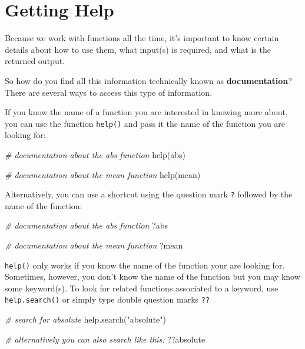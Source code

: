 \documentclass[
]{book}
\newenvironment{Shaded}{\begin{snugshade}}{\end{snugshade}}
\newcommand{\CommentTok}[1]{\textcolor[rgb]{0.56,0.35,0.01}{\textit{#1}}}
\newcommand{\FunctionTok}[1]{\textcolor[rgb]{0.00,0.00,0.00}{#1}}
\newcommand{\NormalTok}[1]{#1}
\newcommand{\StringTok}[1]{\textcolor[rgb]{0.31,0.60,0.02}{#1}}
\begin{document}
\hypertarget{help-documentation}{%
\section{Getting Help}\label{help-documentation}}

Because we work with functions all the time, it's important to know certain
details about how to use them, what input(s) is required, and what is the
returned output.

So how do you find all this information technically known as \textbf{documentation}?
There are several ways to access this type of information.

If you know the name of a function you are interested in knowing more about,
you can use the function \texttt{help()} and pass it the name of the function you
are looking for:

\begin{Shaded}
\begin{Highlighting}[]
\CommentTok{\# documentation about the \textquotesingle{}abs\textquotesingle{} function}
\FunctionTok{help}\NormalTok{(abs)}

\CommentTok{\# documentation about the \textquotesingle{}mean\textquotesingle{} function}
\FunctionTok{help}\NormalTok{(mean)}
\end{Highlighting}
\end{Shaded}

Alternatively, you can use a shortcut using the question mark \texttt{?} followed
by the name of the function:

\begin{Shaded}
\begin{Highlighting}[]
\CommentTok{\# documentation about the \textquotesingle{}abs\textquotesingle{} function}
\NormalTok{?abs}

\CommentTok{\# documentation about the \textquotesingle{}mean\textquotesingle{} function}
\NormalTok{?mean}
\end{Highlighting}
\end{Shaded}

\texttt{help()} only works if you know the name of the function your are looking for.
Sometimes, however, you don't know the name of the function but you may know
some keyword(s). To look for related functions associated to a keyword, use
\texttt{help.search()} or simply type double question marks \texttt{??}

\begin{Shaded}
\begin{Highlighting}[]
\CommentTok{\# search for \textquotesingle{}absolute\textquotesingle{}}
\FunctionTok{help.search}\NormalTok{(}\StringTok{"absolute"}\NormalTok{)}

\CommentTok{\# alternatively you can also search like this:}
\NormalTok{??absolute}
\end{Highlighting}
\end{Shaded}
\end{document}
